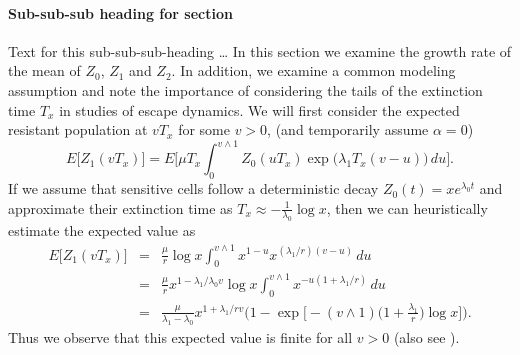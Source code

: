 \documentclass{bmcart}
\begin{document}
\paragraph*{Sub-sub-sub heading for section}
Text for this sub-sub-sub-heading \ldots
In this section we examine the growth rate of the mean of $Z_0$, $Z_1$ and $Z_2$. In
addition, we examine a common modeling assumption and note the
importance of considering the tails of the extinction time $T_x$ in
studies of escape dynamics.
We will first consider the expected resistant population at $vT_x$ for
some $v>0$, (and temporarily assume $\alpha=0$)
%
\[
 E \bigl[Z_1(vT_x) \bigr]= E
\biggl[\mu T_x\int_0^{v\wedge
1}Z_0(uT_x)
\exp \bigl(\lambda_1T_x(v-u) \bigr)\,du \biggr].
\]
%
If we assume that sensitive cells follow a deterministic decay
$Z_0(t)=xe^{\lambda_0 t}$ and approximate their extinction time as
$T_x\approx-\frac{1}{\lambda_0}\log x$, then we can heuristically
estimate the expected value as
%
\begin{eqnarray}\label{eqexpmuts}
E\bigl[Z_1(vT_x)\bigr] &=& \frac{\mu}{r}\log x
\int_0^{v\wedge1}x^{1-u}x^{({\lambda_1}/{r})(v-u)}\,du
\nonumber\\
&=& \frac{\mu}{r}x^{1-{\lambda_1}/{\lambda_0}v}\log x\int_0^{v\wedge
1}x^{-u(1+{\lambda_1}/{r})}\,du
\nonumber\\
&=& \frac{\mu}{\lambda_1-\lambda_0}x^{1+{\lambda_1}/{r}v} \biggl(1-\exp \biggl[-(v\wedge1) \biggl(1+
\frac{\lambda_1}{r}\biggr)\log x \biggr] \biggr).
\end{eqnarray}
%
Thus we observe that this expected value is finite for all $v>0$ (also see \cite{koon,khar,zvai,xjon,marg}).

\end{document}
